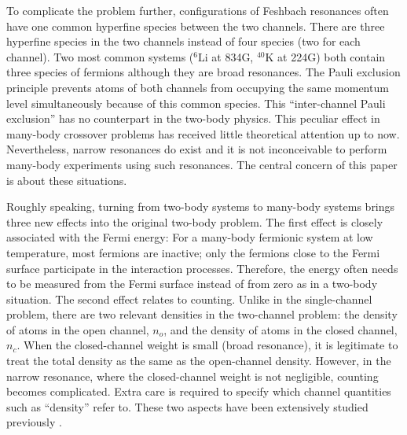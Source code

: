 \documentclass[reprint,pra]{revtex4-1}
\begin{document}

To complicate the problem  further,   configurations of Feshbach resonances often have one common hyperfine species between the two channels. There are three hyperfine species in the  two channels instead of four species (two for each channel).  Two most common systems (${}^{6}\text{Li}$ at 834G, $^{40}\text{K}$ at 224G) both contain three species of fermions although they are broad resonances.  The Pauli exclusion principle prevents  atoms of both channels from occupying the same momentum level simultaneously because of this common species.  This ``inter-channel Pauli exclusion'' has no counterpart in the two-body physics. This peculiar effect  in many-body crossover problems has  received little theoretical attention up to now.    Nevertheless,   narrow resonances do exist \cite{ChinRMP} and it is not  inconceivable to perform many-body experiments using such resonances.  The central concern of this paper is about these situations. 

Roughly speaking, turning from two-body systems to many-body systems brings three new effects into the original two-body problem.  The first effect is closely associated with the Fermi energy:  For a many-body fermionic system at low temperature, most fermions are inactive; only the fermions close to the Fermi surface participate in the interaction processes. Therefore, the energy often needs to be measured from the Fermi surface instead of from zero as in a two-body situation. 
The second effect relates to counting. Unlike in the single-channel problem, there are two relevant densities in the two-channel problem: the density of atoms in the open channel, $n_{o}$, and the density of atoms in the closed channel, $n_{c}$. When the closed-channel weight is small (broad resonance), it is legitimate to treat the total density as the same as the open-channel density.  However, in the narrow resonance, where the closed-channel weight is not negligible, counting becomes complicated.  Extra care is required to specify which channel quantities such as ``density'' refer to.  These two aspects have been   extensively studied previously \cite{JacksonNarrow,GurarieNarrow}.
\end{document}

